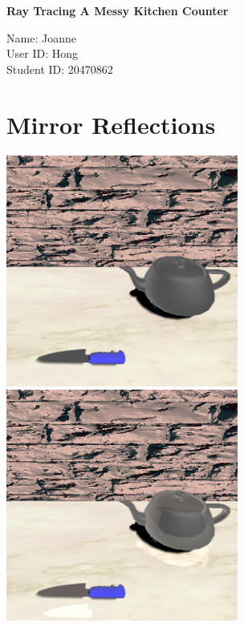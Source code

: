 \documentclass{article}
\newcommand\projecttitle{Ray Tracing A Messy Kitchen Counter}
\newcommand\myname{Joanne}
\newcommand\myuserid{Hong}
\newcommand\mystudentid{20470862}
\begin{document}
\begin{minipage}[t]{3in}
{\huge \bf 
	\projecttitle 
}

\medskip
Name: \myname \\ 
User ID: \myuserid \\ 
Student ID: \mystudentid 
\end{minipage}
\hfill
\begin{minipage}[t]{3in}
\vspace{0pt}
\end{minipage}

\section{Mirror Reflections}
\includegraphics[width=3in]{Assets/no_reflection.png}
\includegraphics[width=3in]{Assets/reflection.png}
\end{document}
